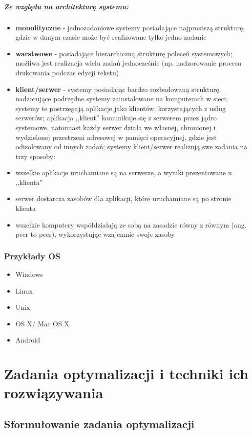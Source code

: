 \documentclass[a4paper,twoside]{report}
\begin{document}
\subparagraph{Ze względu na architekturę systemu:}
\begin{itemize}
\item \textbf{monolityczne} - jednozadaniowe systemy posiadające najprostszą strukturę, gdzie w danym czasie może być realizowane tylko jedno zadanie
\item \textbf{warstwowe} - posiadające hierarchiczną strukturę poleceń systemowych; możliwa jest realizacja wielu zadań jednocześnie (np. nadzorowanie procesu drukowania podczas edycji tekstu)
\item \textbf{klient/serwer} - systemy posiadając bardzo rozbudowaną strukturę, nadzorujące podrzędne systemy zainstalowane na komputerach w sieci; systemy te postrzegają aplikacje jako klientów, korzystających z usług serwerów; aplikacja ,,klient'' komunikuje się z serwerem przez jądro systemowe, natomiast każdy serwer działa we własnej, chronionej i wydzielonej przestrzeni adresowej w pamięci operacyjnej, gdzie jest odizolowany od innych zadań; systemy klient/serwer realizują swe zadania na trzy sposoby:
\item wszelkie aplikacje uruchamiane są na serwerze, a wyniki prezentowane u ,,klienta''
\item serwer dostarcza zasobów dla aplikacji, które uruchamiane są po stronie klienta
\item wszelkie komputery współdziałają ze sobą na zasadzie równy z równym (ang. peer to peer), wykorzystując wzajemnie swoje zasoby
\end{itemize}

\subsubsection{Przykłady OS}
\begin{itemize}
\item Windows
\item Linux
\item Unix
\item OS X/ Mac OS X
\item Android
\end{itemize}

\section{Zadania optymalizacji i techniki ich rozwiązywania}

\subsection{Sformułowanie zadania optymalizacji}
\end{document}
